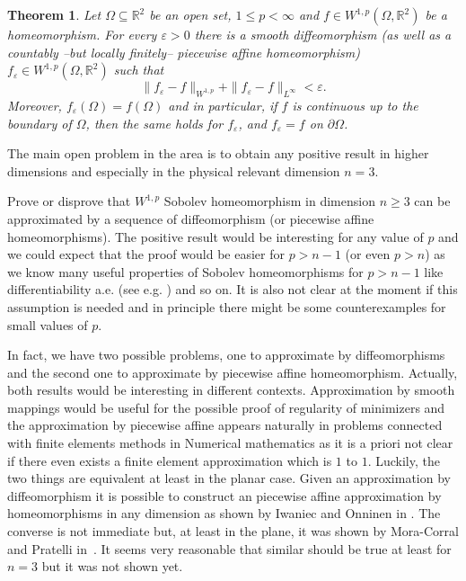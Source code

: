 \documentclass[12pt,a4paper]{amsart}
\theoremstyle{plain}
\newtheorem{thm}{Theorem}[section]
\theoremstyle{definition}
\numberwithin{equation}{section}
\def\epsilon{\varepsilon}
\def\er{\mathbb R}
\def\eps{\epsilon}
\newcounter{problem}
\begin{document}
\begin{thm}\label{main}
Let $\Omega\subseteq\er^2$ be an open set, $1\leq p<\infty$ and $f\in W^{1,p}(\Omega,\er^2)$ be a homeomorphism. For every $\eps>0$ there is a smooth diffeomorphism (as well as a countably --but locally finitely-- piecewise affine homeomorphism) $f_\eps\in W^{1,p}(\Omega,\er^2)$ such that 
$$
\|f_\eps-f\|_{W^{1,p}}+\|f_\eps-f\|_{L^\infty}<\eps. 
$$
Moreover, $f_\eps(\Omega)=f(\Omega)$ and in particular, if $f$ is continuous up to the boundary of $\Omega$, then the same holds for $f_\eps$, and $f_\eps=f$ on $\partial\Omega$.
\end{thm}

 The main open problem in the area is to obtain any positive result in higher dimensions and especially in the physical relevant dimension $n=3$. 


 Prove or disprove that $W^{1,p}$ Sobolev homeomorphism in dimension $n\geq 3$ can be approximated by a sequence of diffeomorphism (or piecewise affine homeomorphisms). The positive result would be interesting for any value of $p$ and we could expect that the proof would be easier for $p>n-1$ (or even $p>n$) 
as we know many useful properties of Sobolev homeomorphisms for $p>n-1$ like differentiability a.e. (see e.g. \cite[Corollary 2.25]{HK}) and so on. It is also not clear at the moment if this assumption is needed and in principle there might be some counterexamples for small values of $p$. 

\vskip 10pt

In fact, we have two possible problems, one to approximate by diffeomorphisms and the second one to approximate by piecewise affine homeomorphism. Actually, both results would be interesting in different contexts. Approximation by smooth mappings would be useful for the possible proof of regularity of minimizers and the approximation by piecewise affine appears naturally in problems connected with finite elements methods in Numerical mathematics as it is a priori not clear if there even exists a finite element approximation which is $1$ to $1$.  
Luckily, the two things are equivalent at least in the planar case. 
Given an approximation by diffeomorphism it is possible to construct an piecewise affine approximation by homeomorphisms in any dimension as shown by Iwaniec and Onninen in \cite{IO3}. 
The converse is not immediate but, at least in the plane, it was shown by Mora-Corral and Pratelli in~\cite{MP}. 
It seems very reasonable that similar should be true at least for $n=3$ but it was not shown yet. 
\end{document}
